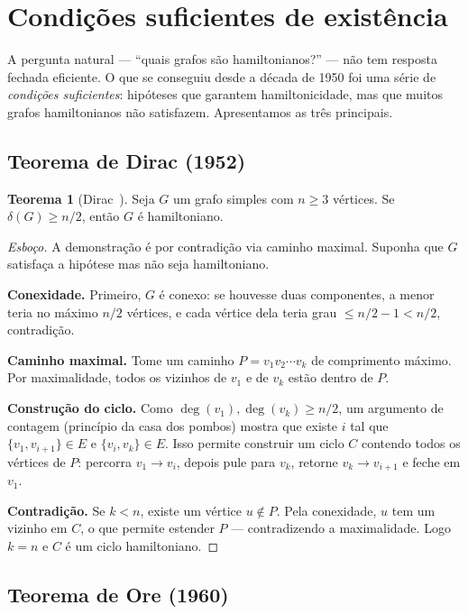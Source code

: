 \documentclass[11pt,a4paper]{article}
\theoremstyle{definition}
\newtheorem{teo}{Teorema}[section]
\begin{document}
\section{Condições suficientes de existência}

A pergunta natural --- ``quais grafos são hamiltonianos?'' --- não tem resposta fechada eficiente. O que se conseguiu desde a década de 1950 foi uma série de \emph{condições suficientes}: hipóteses que garantem hamiltonicidade, mas que muitos grafos hamiltonianos não satisfazem. Apresentamos as três principais.

\subsection{Teorema de Dirac (1952)}

\begin{teo}[Dirac~\citep{dirac1952}]
Seja $G$ um grafo simples com $n \geq 3$ vértices. Se $\delta(G) \geq n/2$, então $G$ é hamiltoniano.
\end{teo}

\begin{proof}[Esboço]
A demonstração é por contradição via caminho maximal. Suponha que $G$ satisfaça a hipótese mas não seja hamiltoniano.

\textbf{Conexidade.} Primeiro, $G$ é conexo: se houvesse duas componentes, a menor teria no máximo $n/2$ vértices, e cada vértice dela teria grau $\leq n/2 - 1 < n/2$, contradição.

\textbf{Caminho maximal.} Tome um caminho $P = v_1 v_2 \cdots v_k$ de comprimento máximo. Por maximalidade, todos os vizinhos de $v_1$ e de $v_k$ estão dentro de $P$.

\textbf{Construção do ciclo.} Como $\deg(v_1), \deg(v_k) \geq n/2$, um argumento de contagem (princípio da casa dos pombos) mostra que existe $i$ tal que $\{v_1, v_{i+1}\} \in E$ e $\{v_i, v_k\} \in E$. Isso permite construir um ciclo $C$ contendo todos os vértices de $P$: percorra $v_1 \to v_i$, depois pule para $v_k$, retorne $v_k \to v_{i+1}$ e feche em $v_1$.

\textbf{Contradição.} Se $k < n$, existe um vértice $u \notin P$. Pela conexidade, $u$ tem um vizinho em $C$, o que permite estender $P$ --- contradizendo a maximalidade. Logo $k = n$ e $C$ é um ciclo hamiltoniano.
\end{proof}

\subsection{Teorema de Ore (1960)}
\end{document}
